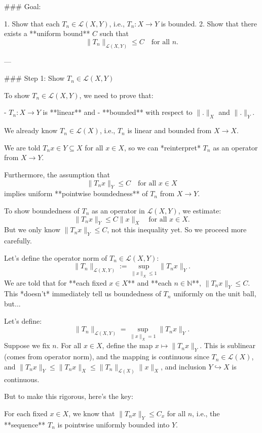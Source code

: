 ### Goal:

1. Show that each \( T_n \in \mathcal{L}(X, Y) \), i.e., \( T_n: X \to Y \) is bounded.
2. Show that there exists a **uniform bound** \( C \) such that
   \[
   \|T_n\|_{\mathcal{L}(X, Y)} \leq C \quad \text{for all } n.
   \]

---

### Step 1: Show \( T_n \in \mathcal{L}(X, Y) \)

To show \( T_n \in \mathcal{L}(X, Y) \), we need to prove that:

- \( T_n: X \to Y \) is **linear** and
- **bounded** with respect to \( \|.\|_X \) and \( \|.\|_Y \).

We already know \( T_n \in \mathcal{L}(X) \), i.e., \( T_n \) is linear and bounded from \( X \to X \).

We are told \( T_n x \in Y \subseteq X \) for all \( x \in X \), so we can *reinterpret* \( T_n \) as an operator from \( X \to Y \).

Furthermore, the assumption that
\[
\|T_n x\|_Y \leq C \quad \text{for all } x \in X
\]
implies uniform **pointwise boundedness** of \( T_n \) from \( X \to Y \).

To show boundedness of \( T_n \) as an operator in \( \mathcal{L}(X, Y) \), we estimate:
\[
\|T_n x\|_Y \leq C \|x\|_X \quad \text{for all } x \in X.
\]
But we only know \( \|T_n x\|_Y \leq C \), not this inequality yet. So we proceed more carefully.

Let’s define the operator norm of \( T_n \in \mathcal{L}(X, Y) \):
\[
\|T_n\|_{\mathcal{L}(X, Y)} := \sup_{\|x\|_X \leq 1} \|T_n x\|_Y.
\]
We are told that for **each fixed \( x \in X \)** and **each \( n \in \mathbb{N} \)**, \( \|T_n x\|_Y \leq C \). This *doesn't* immediately tell us boundedness of \( T_n \) uniformly on the unit ball, but...

Let’s define:
\[
\|T_n\|_{\mathcal{L}(X, Y)} = \sup_{\|x\|_X = 1} \|T_n x\|_Y.
\]
Suppose we fix \( n \). For all \( x \in X \), define the map \( x \mapsto \|T_n x\|_Y \). This is sublinear (comes from operator norm), and the mapping is continuous since \( T_n \in \mathcal{L}(X) \), and \( \|T_n x\|_Y \leq \|T_n x\|_X \leq \|T_n\|_{\mathcal{L}(X)} \|x\|_X \), and inclusion \( Y \hookrightarrow X \) is continuous.

But to make this rigorous, here’s the key:

For each fixed \( x \in X \), we know that \( \|T_n x\|_Y \leq C_x \) for all \( n \), i.e., the **sequence** \( T_n \) is pointwise uniformly bounded into \( Y \).

